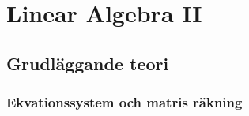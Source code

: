 \chapter{Linear Algebra II}

\newpage



\section{Grudläggande teori} %
\subsection{Ekvationssystem och matris räkning}
